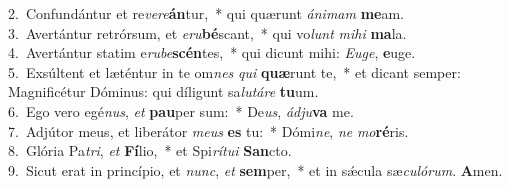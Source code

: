 {2.~}Confundántur et re\textit{ve}\textit{re}\textbf{án}tur,~* qui quærunt \textit{á}\textit{ni}\textit{mam} \textbf{me}am.\\
{3.~}Avertántur retrórsum, et \textit{e}\textit{ru}\textbf{bé}scant,~* qui vo\textit{lunt} \textit{mi}\textit{hi} \textbf{ma}la.\\
{4.~}Avertántur statim e\textit{ru}\textit{be}\textbf{scén}tes,~* qui dicunt mihi: \textit{E}\textit{u}\textit{ge}, \textbf{e}uge.\\
{5.~}Exsúltent et læténtur in te om\textit{nes} \textit{qui} \textbf{quæ}runt te,~* et dicant semper: Magnificétur Dóminus: qui díligunt sa\textit{lu}\textit{tá}\textit{re} \textbf{tu}um.\\
{6.~}Ego vero egé\textit{nus}, \textit{et} \textbf{pau}per sum:~* De\textit{us}, \textit{ád}\textit{ju}\textbf{va} me.\\
{7.~}Adjútor meus, et liberátor \textit{me}\textit{us} \textbf{es} tu:~* Dómi\textit{ne}, \textit{ne} \textit{mo}\textbf{ré}ris.\\
{8.~}Glória Pa\textit{tri}, \textit{et} \textbf{Fí}lio,~* et Spi\textit{rí}\textit{tu}\textit{i} \textbf{San}cto.\\
{9.~}Sicut erat in princípio, et \textit{nunc}, \textit{et} \textbf{sem}per,~* et in sǽcula sæ\textit{cu}\textit{ló}\textit{rum}. \textbf{A}men.\\
